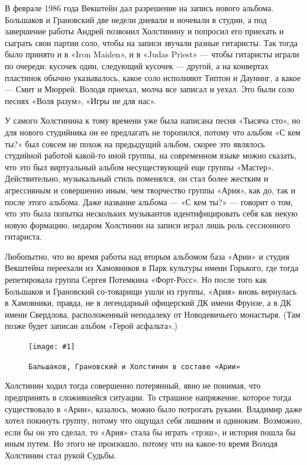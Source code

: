 \documentclass[16pt,a5paper]{book}
\newcommand{\myincludegraphics}[1]{\texttt{[image: \#1]}}
\begin{document}
В феврале 1986 года Векштейн дал разрешение на запись нового альбома. Большаков и Грановский две недели дневали и
ночевали в студии, а под завершение работы Андрей позвонил Холстинину и попросил его приехать и сыграть свои партии
соло, чтобы на записи звучали разные гитаристы. Так тогда было принято и в «Iron Maiden», и в «Judas Priest» — чтобы
гитаристы играли по очереди: кусочек один, следующий кусочек — другой, а на конвертах пластинок обычно указывалось,
какое соло исполняют Типтон и Даунинг, а какое — Смит и Мюррей. Володя приехал, молча все записал и уехал. Это были соло
песнях «Воля разум», «Игры не для нас».

У самого Холстинина к тому времени уже была написана песня «Тысяча сто», но для нового студийника он ее предлагать не
торопился, потому что альбом «С кем ты?» был совсем не похож на предыдущий альбом, скорее это являлось студийной работой
какой-то иной группы, на современном языке можно сказать, что это был виртуальный альбом несуществующей еще группы
«Мастер». Действительно, музыкальный стиль поменялся, он стал более жестким и агрессивным и совершенно иным, чем
творчество группы «Ария», как до, так и после этого альбома. Даже название альбома — «С кем ты?» — говорит о том, что
это была попытка нескольких музыкантов идентифицировать себя как некую новую формацию, недаром Холстинин на записи играл
лишь роль сессионного гитариста.

Любопытно, что во время работы над вторым альбомом база «Арии» и студия Векштейна переехали из Хамовников в Парк
культуры имени Горького, где тогда репетировала группа Сергея Потемкина «Форт-Росс». Но после того как Большаков и
Грановский со-товарищи ушли из группы, «Ария» вновь вернулась в Хамовники, правда, не в легендарный офицерский ДК имени
Фрунзе, а в ДК имени Свердлова, расположенный неподалеку от Новодевичьего монастыря. (Там позже будет записан альбом
«Герой асфальта».)

\begin{figure}[h]
    \centering
    \myincludegraphics{Image15}
    \caption{\texttt{Бальшаков, Грановский и Холстинин в составе «Арии»}}
\end{figure}

Холстинин ходил тогда совершенно потерянный, явно не понимая, что предпринять в сложившейся ситуации. То страшное
напряжение, которое тогда существовало в «Арии», казалось, можно было потрогать руками. Владимир даже хотел покинуть
группу, потому что ощущал себя лишним и одиноким. Возможно, если бы он это сделал, то «Ария» стала бы играть «трэш», и
история пошла бы иным путем. Но этого не произошло, потому что на какое-то время Володя Холстинин стал рукой Судьбы.
\end{document}
